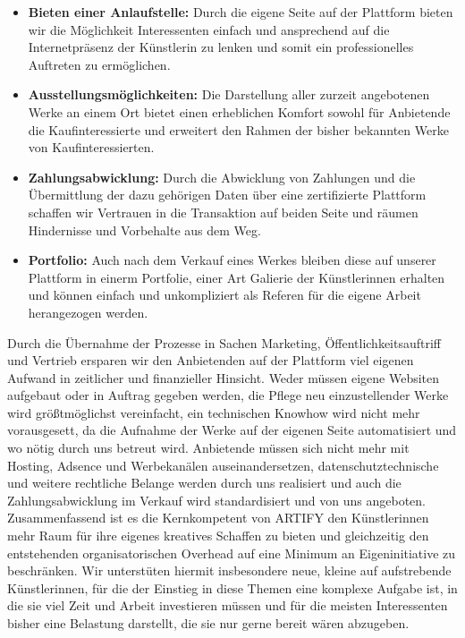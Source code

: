 \documentclass[11pt,a4paper]{report}
\begin{document}
\begin{itemize}
    \item \textbf{Bieten einer Anlaufstelle:} \quad Durch die eigene Seite auf der Plattform bieten wir die Möglichkeit Interessenten einfach und ansprechend auf die Internetpräsenz der Künstlerin zu lenken und somit ein professionelles Auftreten zu ermöglichen.
    \item \textbf{Ausstellungsmöglichkeiten:} \quad Die Darstellung aller zurzeit angebotenen Werke an einem Ort bietet einen erheblichen Komfort sowohl für Anbietende die Kaufinteressierte und erweitert den Rahmen der bisher bekannten Werke von Kaufinteressierten.
    \item \textbf{Zahlungsabwicklung:} \quad Durch die Abwicklung von Zahlungen und die Übermittlung der dazu gehörigen Daten über eine zertifizierte Plattform schaffen wir Vertrauen in die Transaktion auf beiden Seite und räumen Hindernisse und Vorbehalte aus dem Weg.
    \item \textbf{Portfolio:} \quad Auch nach dem Verkauf eines Werkes bleiben diese auf unserer Plattform in einerm Portfolie, einer Art Galierie der Künstlerinnen erhalten und können einfach und unkompliziert als Referen für die eigene Arbeit herangezogen werden.
    \end{itemize}

Durch die Übernahme der Prozesse in Sachen Marketing, Öffentlichkeitsauftriff und Vertrieb ersparen wir den Anbietenden auf der Plattform viel eigenen Aufwand in zeitlicher und finanzieller Hinsicht. Weder müssen eigene Websiten aufgebaut oder in Auftrag gegeben werden, die Pflege neu einzustellender Werke wird größtmöglichst vereinfacht, ein technischen Knowhow wird nicht mehr vorausgesett, da die Aufnahme der Werke auf der eigenen Seite automatisiert und wo nötig durch uns betreut wird. Anbietende müssen sich nicht mehr mit Hosting, Adsence und Werbekanälen auseinandersetzen, datenschutztechnische und weitere rechtliche Belange werden durch uns realisiert und auch die Zahlungsabwicklung im Verkauf wird standardisiert und von uns angeboten.\\ Zusammenfassend ist es die Kernkompetent von ARTIFY den Künstlerinnen mehr Raum für ihre eigenes kreatives Schaffen zu bieten und gleichzeitig den entstehenden organisatorischen Overhead auf eine Minimum an Eigeninitiative zu beschränken. Wir unterstüten hiermit insbesondere neue, kleine auf aufstrebende Künstlerinnen, für die der Einstieg in diese Themen eine komplexe Aufgabe ist, in die sie viel Zeit und Arbeit investieren müssen und für die meisten Interessenten bisher eine Belastung darstellt, die sie nur gerne bereit wären abzugeben. 
    
\end{document}
